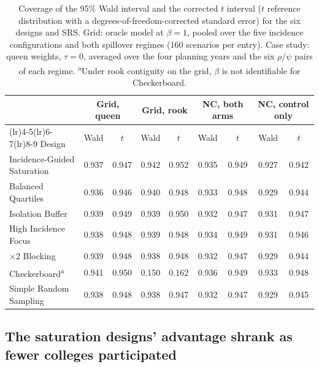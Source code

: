 \documentclass[11pt]{article}
\begin{document}
\begin{table}[!htb]
\small
\centering
\caption{Coverage of the 95\% Wald interval and the corrected $t$ interval ($t$ reference distribution with a degrees-of-freedom-corrected standard error) for the six designs and SRS. Grid: oracle model at $\beta = 1$, pooled over the five incidence configurations and both spillover regimes (160 scenarios per entry). Case study: queen weights, $\tau = 0$, averaged over the four planning years and the six $\rho/\psi$ pairs of each regime. \textsuperscript{a}Under rook contiguity on the grid, $\beta$ is not identifiable for Checkerboard.}
\label{tab:interval-comparison}
\begin{tabular}{>{\raggedright\arraybackslash}p{3.4cm}cccccccc}
\toprule
& \multicolumn{2}{c}{Grid, queen} & \multicolumn{2}{c}{Grid, rook} & \multicolumn{2}{c}{NC, both arms} & \multicolumn{2}{c}{NC, control only} \\
\cmidrule(lr){2-3}\cmidrule(lr){4-5}\cmidrule(lr){6-7}\cmidrule(lr){8-9}
Design & Wald & $t$ & Wald & $t$ & Wald & $t$ & Wald & $t$ \\
\midrule
Incidence-Guided Saturation & 0.937 & 0.947 & 0.942 & 0.952 & 0.935 & 0.949 & 0.927 & 0.942 \\
Balanced Quartiles & 0.936 & 0.946 & 0.940 & 0.948 & 0.933 & 0.948 & 0.929 & 0.944 \\
Isolation Buffer & 0.939 & 0.949 & 0.939 & 0.950 & 0.932 & 0.947 & 0.931 & 0.947 \\
High Incidence Focus & 0.938 & 0.948 & 0.939 & 0.948 & 0.934 & 0.949 & 0.931 & 0.946 \\
2$\times$2 Blocking & 0.939 & 0.948 & 0.938 & 0.948 & 0.932 & 0.947 & 0.929 & 0.944 \\
Checkerboard\textsuperscript{a} & 0.941 & 0.950 & 0.150 & 0.162 & 0.936 & 0.949 & 0.933 & 0.948 \\
Simple Random Sampling & 0.938 & 0.948 & 0.938 & 0.947 & 0.932 & 0.947 & 0.929 & 0.945 \\
\bottomrule
\end{tabular}
\end{table}


\subsection{The saturation designs' advantage shrank as fewer colleges participated}\label{guidance-partial-participation}
\end{document}
